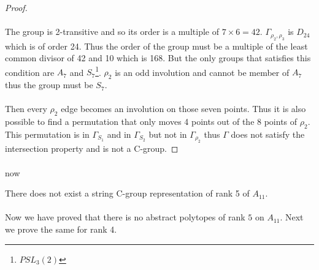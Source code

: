 \begin{proof}
  \paragraph{}
  The group is 2-transitive and so its order is a multiple of $7 \times 6 = 42$. $\Gamma_{\rho_2, \rho_3}$ is $D_{24}$ which is of order 24. Thus the order of the group must be a multiple of the least common divisor of 42 and 10 which is 168. But the only groups that satisfies this condition are $A_7$ and $S_7$\footnote{$PSL_3(2)$}. $\rho_2$ is an odd involution and cannot be member of $A_7$ thus the group must be $S_7$.

  \paragraph{}
  Then every $\rho_2$ edge becomes an involution on those seven points. Thus it is also possible to find a permutation that only moves 4 points out of the 8 points of $\rho_2$. This permutation is in $\Gamma_{S_1}$ and in $\Gamma_{S_2}$ but not in $\Gamma_{\rho_2}$ thus $\Gamma$ does not satisfy the intersection property and is not a C-group.

\end{proof}

\paragraph{}
now

\begin{theorem}
  There does not exist a string C-group representation of rank 5 of $A_{11}$.
\end{theorem}

\paragraph{}
Now we have proved that there is no abstract polytopes of rank $5$ on $A_{11}$. Next we prove the same for rank 4.

